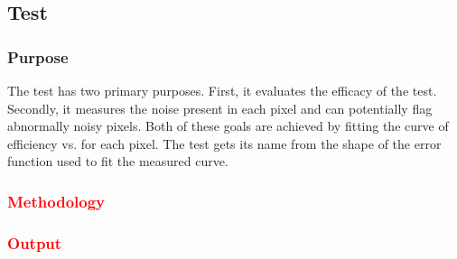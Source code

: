 
\subsection{\scurves Test}
\label{ss:scurves}

\subsubsection{Purpose}

The \scurves test has two primary purposes.
First, it evaluates the efficacy of the \trimming test.
Secondly, it measures the noise present in each pixel and can potentially flag abnormally noisy pixels.
Both of these goals are achieved by fitting the curve of efficiency vs. \vcal for each pixel.
The test gets its name from the shape of the error function used to fit the measured curve.

\subsubsection{\textcolor{red}{Methodology}}
\subsubsection{\textcolor{red}{Output}}

